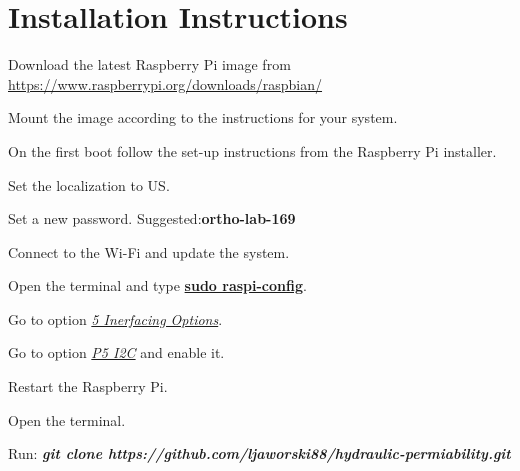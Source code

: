 \documentclass[12pt]{article}
\begin{document}
\tableofcontents

\newpage

\section{Installation Instructions}

\begin{inparaenum}
\item Download the latest Raspberry Pi image from \url{https://www.raspberrypi.org/downloads/raspbian/}
    \item Mount the image according to the instructions for your system.
    \item On the first boot follow the set-up instructions from the Raspberry Pi installer.
    \begin{inparaenum}
        \item Set the localization to US.
        \item Set a new password. Suggested:\textbf{ortho-lab-169}
        \item Connect to the Wi-Fi and update the system.
    \end{inparaenum}
    \item Open the terminal and type \textbf{\underline{sudo raspi-config}}.
    \begin{inparaenum}
        \item Go to option \textit{\underline{5 Inerfacing Options}}.
        \item Go to option \textit{\underline{P5 I2C}} and enable it.
    \end{inparaenum}
    \item Restart the Raspberry Pi.
    \item Open the terminal.
    \item Run: \textbf{\textit{git clone https://github.com/ljaworski88/hydraulic-permiability.git}}
\end{inparaenum}
\end{document}
